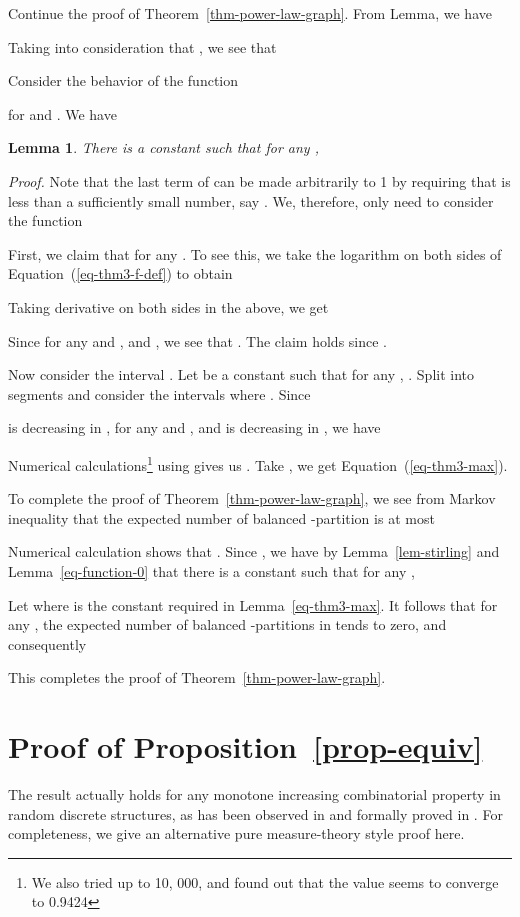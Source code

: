 \documentclass[11pt]{article}
\newtheorem{lemma}{Lemma}[section]
\providecommand{\qed}{\hfill }
\newenvironment{proof}[0]{\textit{Proof.} }{\hfill  \qed}
\begin{document}
Continue the proof of Theorem~\ref{thm-power-law-graph}. From Lemma,   
we have
 
Taking into consideration that , we see  that

Consider the behavior of the function 

for  and . 
We have
\begin{lemma} 
There is a constant  such that for any , 

\end{lemma}
\begin{proof} 
Note that the last term  of  can be made arbitrarily 
to 1 by requiring that  is less than a sufficiently small number, say .  
We, therefore, only need to consider the function 


First, we claim that 
for any . 
To see this, we  take the logarithm on both sides of Equation~(\ref{eq-thm3-f-def}) to obtain

Taking derivative on both sides in the above, we get

Since for any  and ,  
 and
, we see that
. The claim
holds since .

Now consider the interval . Let  be a constant such that for any 
, .
Split  into  segments
and consider the  intervals  where
. Since 

is decreasing in ,  for any  and 
, and  is decreasing in , we have
  
Numerical calculations\footnote{We also tried  up to 10, 000, and found out that the value seems to converge to 0.9424} using  gives us 
.
Take , we get Equation~(\ref{eq-thm3-max}).  
\end{proof}


To complete the proof of Theorem~\ref{thm-power-law-graph}, we see from Markov inequality
that the expected number of balanced -partition is at most
 
Numerical calculation shows that . Since , 
we have by Lemma~\ref{lem-stirling}
and Lemma~\ref{eq-function-0} that there is a constant  such that for any 
, 


Let  where  is the constant required 
in Lemma~\ref{eq-thm3-max}. It follows that
for any , the expected number of balanced -partitions in 
 tends to zero, and consequently 
 
This completes the proof of Theorem~\ref{thm-power-law-graph}. 

\appendix 
\section{Proof of Proposition~\ref{prop-equiv}}
\label{appendix-1}
The result actually holds for any monotone increasing combinatorial property in 
random discrete structures,    
as has been observed in \cite{kirousis94threshold,achlioptas99thesis} and formally proved in \cite{kirousis96tech}. For completeness, we give an alternative pure measure-theory style 
proof here.   
\end{document}
